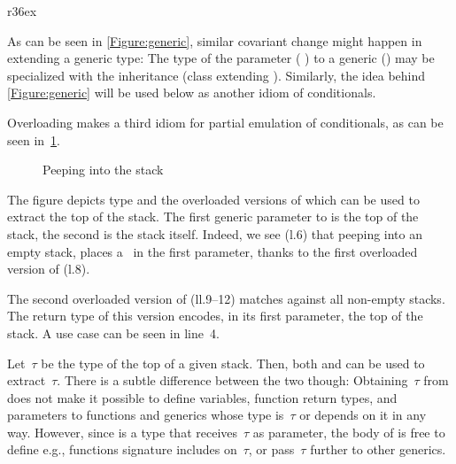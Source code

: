 \begin{wrapfigure}[6]r{36ex}
  \caption{\label{Figure:generic} Covariance of parameters to generics}
\end{wrapfigure}

As can be seen in \cref{Figure:generic}, similar covariant change might happen in extending a generic type:
The type of the parameter ( ) to a generic () may
be specialized with the inheritance (class  extending ).
Similarly, the idea behind \cref{Figure:generic} will be used
  below as another idiom of conditionals.

Overloading makes a third idiom for partial emulation of conditionals, as can be seen
  in~\cref{Figure:peep}.

\begin{figure}[htb]%
  \caption{Peeping into the stack}%
  \label{Figure:peep}%
  \lstset{style=numbered}
\end{figure}

The figure depicts type  and the overloaded versions of  which can be used to
  extract the top of the stack.
The first generic parameter to  is the top of the stack, the second is the stack itself.
Indeed, we see (l.6) that peeping into an empty stack, places a~
  in the first parameter, thanks to the first overloaded version of  (l.8).

The second overloaded version of  (ll.9--12) matches
 against all non-empty stacks. The return type
 of this version encodes,
 in its first parameter,
 the top of the stack.
A use case can be seen in line~4.

Let~$τ$ be the type of the top of a given stack.
Then, both  and  can be used to extract~$τ$.
There is a subtle difference between the two though:
Obtaining~$τ$ from  does
  not make it possible to define variables, function return types, and
  parameters to functions and generics whose type is~$τ$ or depends on it in any way.
However, since  is a type that receives~$τ$ as parameter,
  the body of  is free to define e.g., functions signature includes on~$τ$,
  or pass~$τ$ further to other generics.
